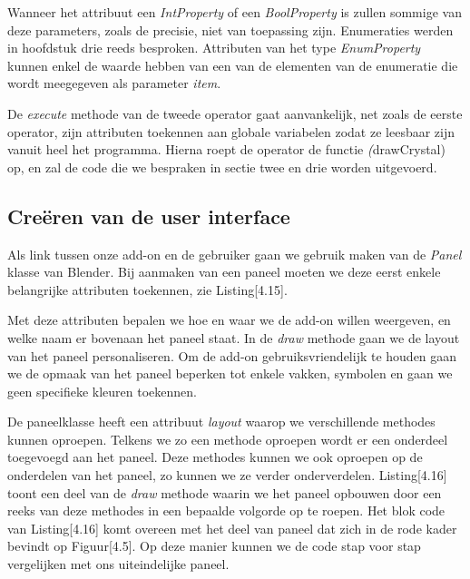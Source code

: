 Wanneer het attribuut een \textit{IntProperty} of een \textit{BoolProperty} is zullen sommige van deze parameters, zoals de precisie, niet van toepassing zijn. Enumeraties werden in hoofdstuk drie reeds besproken. Attributen van het type \textit{EnumProperty} kunnen enkel de waarde hebben van een van de elementen van de enumeratie die wordt meegegeven als parameter \textit{item}.
\par
De \textit{execute} methode van de tweede operator gaat aanvankelijk, net zoals de eerste operator, zijn attributen toekennen aan globale variabelen zodat ze leesbaar zijn vanuit heel het programma. Hierna roept de operator de functie \textit(drawCrystal) op, en zal de code die we bespraken in sectie twee en drie  worden uitgevoerd.  

\subsection{Creëren van de user interface}
Als link tussen onze add-on en de gebruiker gaan we gebruik maken van de \textit{Panel} klasse van Blender. Bij aanmaken van een paneel moeten we deze eerst enkele belangrijke attributen toekennen, zie Listing[4.15].
 


Met deze attributen bepalen we hoe en waar we de add-on willen weergeven, en welke naam er bovenaan het paneel staat. In de \textit{draw} methode gaan we de layout van het paneel personaliseren. Om de add-on gebruiksvriendelijk te houden gaan we de opmaak van het paneel beperken tot enkele vakken, symbolen en gaan we geen specifieke kleuren toekennen.
\par
De paneelklasse heeft een attribuut \textit{layout} waarop we verschillende methodes kunnen oproepen. Telkens we zo een methode oproepen wordt er een onderdeel toegevoegd aan het paneel. Deze methodes kunnen we ook oproepen op de onderdelen van het paneel, zo kunnen we ze verder onderverdelen. Listing[4.16] toont een deel van de \textit{draw} methode waarin we het paneel opbouwen door een reeks van deze methodes in een bepaalde volgorde op te roepen. Het blok code van Listing[4.16] komt overeen met het deel van paneel dat zich in de rode kader bevindt op Figuur[4.5]. Op deze manier kunnen we de code stap voor stap vergelijken met ons uiteindelijke paneel.   



